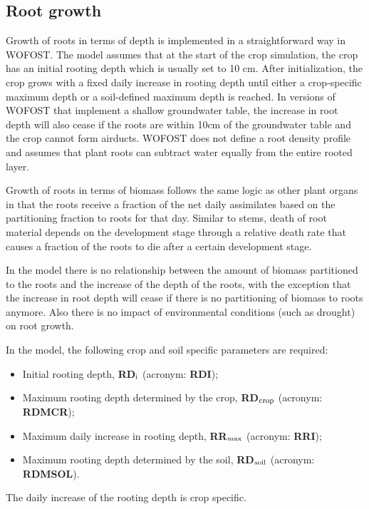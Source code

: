 \subsection{Root growth}
\label{sec:rootgrowth}

Growth of roots in terms of depth is implemented in a straightforward way in WOFOST. 
The model assumes that at the start of the crop simulation, the crop has an initial rooting 
depth which is usually set to 10 cm. After initialization, the crop grows with a fixed daily 
increase in rooting depth until either a crop-specific maximum depth or a soil-defined maximum 
depth is reached. In versions of WOFOST that implement a shallow groundwater table, the 
increase in root depth will also cease if the roots are within 10cm of the groundwater 
table and the crop cannot form airducts. WOFOST does not define a root density profile 
and assumes that plant roots can subtract water equally from the entire rooted layer.

Growth of roots in terms of biomass follows the same logic as other plant organs in that
the roots receive a fraction of the net daily assimilates based on the partitioning 
fraction to roots for that day. Similar to stems, death of root material depends on 
the development stage through a relative death rate that causes a fraction of the 
roots to die after a certain development stage.

In the model there is no relationship between the amount of biomass partitioned to the roots 
and the increase of the depth of the roots, with the exception that the increase in root
depth will cease if there is no partitioning of biomass to roots anymore. Also there is 
no impact of environmental conditions (such as drought) on root growth.

In the model, the following crop and soil specific parameters are required:
\begin{itemize}
	\item Initial rooting depth, {\bf RD$_{{\rm i}}$} (acronym: {\bf RDI});
	\item Maximum rooting depth determined by the crop, {\bf RD$_{{\rm crop}}$} (acronym: {\bf RDMCR});
	\item Maximum daily increase in rooting depth, {\bf RR$_{{\rm max}}$} (acronym: {\bf RRI});
	\item Maximum rooting depth determined by the soil, {\bf RD$_{{\rm soil}}$} (acronym: {\bf RDMSOL}).
\end{itemize}

The daily increase of the rooting depth is crop specific. 

